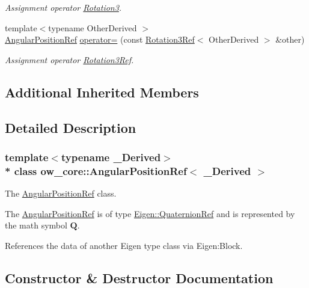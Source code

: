 \begin{DoxyCompactItemize}
\begin{DoxyCompactList}\small\item\em Assignment operator \hyperlink{classow__core_1_1Rotation3}{Rotation3}. \end{DoxyCompactList}\item 
{\footnotesize template$<$typename Other\+Derived $>$ }\\\hyperlink{classow__core_1_1AngularPositionRef}{Angular\+Position\+Ref} \hyperlink{classow__core_1_1AngularPositionRef_a5bf0c26c2f4ad0edb7b701c7d805a6cd}{operator=} (const \hyperlink{classow__core_1_1Rotation3Ref}{Rotation3\+Ref}$<$ Other\+Derived $>$ \&other)\hypertarget{classow__core_1_1AngularPositionRef_a5bf0c26c2f4ad0edb7b701c7d805a6cd}{}\label{classow__core_1_1AngularPositionRef_a5bf0c26c2f4ad0edb7b701c7d805a6cd}

\begin{DoxyCompactList}\small\item\em Assignment operator \hyperlink{classow__core_1_1Rotation3Ref}{Rotation3\+Ref}. \end{DoxyCompactList}\end{DoxyCompactItemize}
\subsection*{Additional Inherited Members}


\subsection{Detailed Description}
\subsubsection*{template$<$typename \+\_\+\+Derived$>$\\*
class ow\+\_\+core\+::\+Angular\+Position\+Ref$<$ \+\_\+\+Derived $>$}

The \hyperlink{classow__core_1_1AngularPositionRef}{Angular\+Position\+Ref} class. 

The \hyperlink{classow__core_1_1AngularPositionRef}{Angular\+Position\+Ref} is of type \hyperlink{classEigen_1_1QuaternionRef}{Eigen\+::\+Quaternion\+Ref} and is represented by the math symbol $\mathbf{Q}$.

References the data of another Eigen type class via Eigen\+:Block. 

\subsection{Constructor \& Destructor Documentation}
